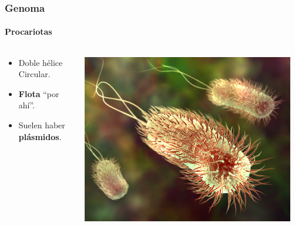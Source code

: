 \begin{frame}
\frametitle{Genoma}
\framesubtitle{Procariotas}
\begin{columns}
\begin{column}{0.5\textwidth}
\begin{itemize}
    \item Doble hélice Circular.
    \item \textbf{Flota} ``por ahí''.
    \item Suelen haber \textbf{plásmidos}.
\end{itemize}
\end{column}
\begin{column}{0.5\textwidth}
	\begin{center}
		\includegraphics[width=0.95\textwidth]{img/procariota.jpg}
	\end{center}
\end{column}
\end{columns}
\end{frame}

